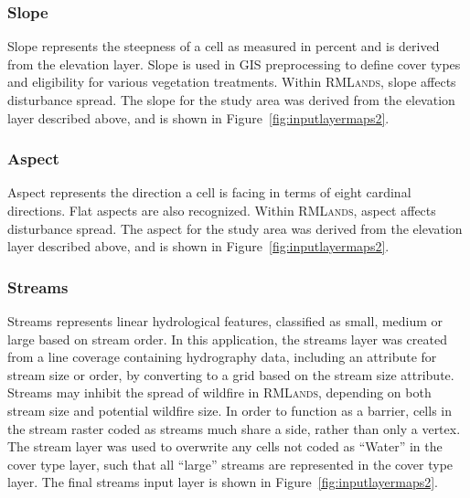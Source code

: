 \subsubsection{Slope} 
Slope represents the steepness of a cell as measured in percent and is derived from the elevation layer. Slope is used in GIS preprocessing to define cover types and eligibility for various vegetation treatments. Within \textsc{RMLands}, slope affects disturbance spread. The slope for the study area was derived from the elevation layer described above, and is shown in Figure~\ref{fig:inputlayermaps2}.


\subsubsection{Aspect} Aspect represents the direction a cell is facing in terms of eight cardinal directions. Flat aspects are also recognized. Within \textsc{RMLands}, aspect affects disturbance spread. The aspect for the study area was derived from the elevation layer described above, and is shown in Figure~\ref{fig:inputlayermaps2}. 


\subsubsection{Streams} 
Streams represents linear hydrological features, classified as small, medium or large based on stream order. In this application, the streams layer was created from a line coverage containing hydrography data, including an attribute for stream size or order, by converting to a grid based on the stream size attribute. Streams may inhibit the spread of wildfire in \textsc{RMLands}, depending on both stream size and potential wildfire size. In order to function as a barrier, cells in the stream raster coded as streams much share a side, rather than only a vertex. The stream layer was used to overwrite any cells not coded as ``Water'' in the cover type layer, such that all ``large'' streams are represented in the cover type layer.  The final streams input layer is shown in Figure~\ref{fig:inputlayermaps2}.


